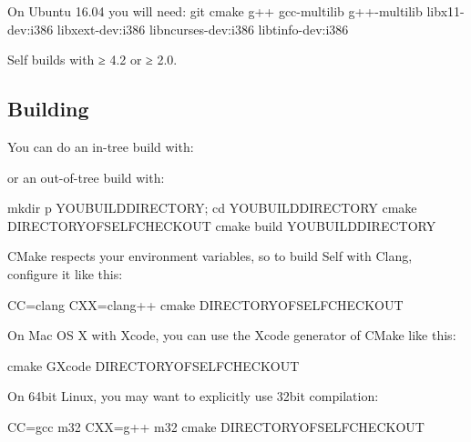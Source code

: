 \documentclass[letterpaper,10pt,english]{sphinxmanual}
\begin{document}
On Ubuntu 16.04 you will need: git cmake g++ gcc-multilib g++-multilib libx11-dev:i386 libxext-dev:i386 libncurses-dev:i386 libtinfo-dev:i386

Self builds with  ≥ 4.2 or  ≥ 2.0.


\subsection{Building}
\label{\detokenize{buildvm:building}}
You can do an in-tree build with:

\begin{sphinxVerbatim}[commandchars=\\\{\}]
 
  
\end{sphinxVerbatim}

or an out-of-tree build with:

\begin{sphinxVerbatim}[commandchars=\\\{\}]
mkdir \PYGZhy{}p \PYGZdl{}YOU\PYGZus{}BUILD\PYGZus{}DIRECTORY; cd \PYGZdl{}YOU\PYGZus{}BUILD\PYGZus{}DIRECTORY
cmake \PYGZdl{}DIRECTORY\PYGZus{}OF\PYGZus{}SELF\PYGZus{}CHECKOUT
cmake \PYGZhy{}\PYGZhy{}build \PYGZdl{}YOU\PYGZus{}BUILD\PYGZus{}DIRECTORY
\end{sphinxVerbatim}

CMake respects your environment variables, so to build Self with Clang, configure it like this:

\begin{sphinxVerbatim}[commandchars=\\\{\}]
CC=clang CXX=clang++ cmake \PYGZdl{}DIRECTORY\PYGZus{}OF\PYGZus{}SELF\PYGZus{}CHECKOUT
\end{sphinxVerbatim}

On Mac OS X with Xcode, you can use the Xcode generator of CMake like this:

\begin{sphinxVerbatim}[commandchars=\\\{\}]
cmake \PYGZhy{}GXcode \PYGZdl{}DIRECTORY\PYGZus{}OF\PYGZus{}SELF\PYGZus{}CHECKOUT
\end{sphinxVerbatim}

On 64bit Linux, you may want to explicitly use 32bit compilation:

\begin{sphinxVerbatim}[commandchars=\\\{\}]
CC=\PYGZdq{}gcc \PYGZhy{}m32\PYGZdq{} CXX=\PYGZdq{}g++ \PYGZhy{}m32\PYGZdq{} cmake \PYGZdl{}DIRECTORY\PYGZus{}OF\PYGZus{}SELF\PYGZus{}CHECKOUT
\end{sphinxVerbatim}
\end{document}
